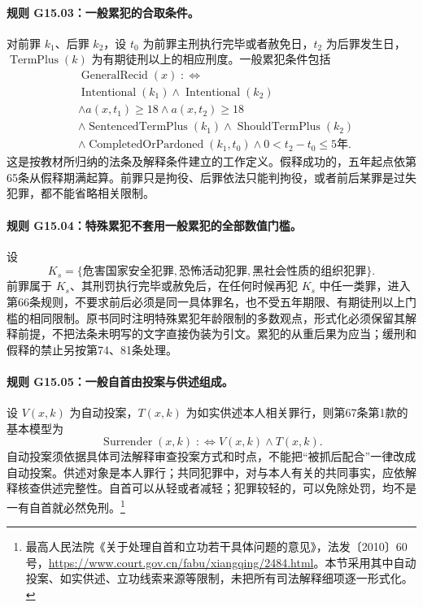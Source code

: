 \paragraph{规则 G15.03：一般累犯的合取条件。}
对前罪 $k_1$、后罪 $k_2$，设 $t_0$ 为前罪主刑执行完毕或者赦免日，$t_2$ 为后罪发生日，$\operatorname{TermPlus}(k)$ 为有期徒刑以上的相应刑度。一般累犯条件包括
\[
\begin{aligned}
&\operatorname{GeneralRecid}(x)\;:\!\!\iff\\
&\operatorname{Intentional}(k_1)\land\operatorname{Intentional}(k_2)\\
&\land a(x,t_1)\ge18\land a(x,t_2)\ge18\\
&\land\operatorname{SentencedTermPlus}(k_1)
\land\operatorname{ShouldTermPlus}(k_2)\\
&\land\operatorname{CompletedOrPardoned}(k_1,t_0)
\land 0<t_2-t_0\le5\text{年}.
\end{aligned}
\]
这是按教材所归纳的法条及解释条件建立的工作定义。假释成功的，五年起点依第65条从假释期满起算。前罪只是拘役、后罪依法只能判拘役，或者前后某罪是过失犯罪，都不能省略相关限制。

\paragraph{规则 G15.04：特殊累犯不套用一般累犯的全部数值门槛。}
设
\[
K_s=\{\text{危害国家安全犯罪},\text{恐怖活动犯罪},
\text{黑社会性质的组织犯罪}\}.
\]
前罪属于 $K_s$、其刑罚执行完毕或赦免后，在任何时候再犯 $K_s$ 中任一类罪，进入第66条规则，不要求前后必须是同一具体罪名，也不受五年期限、有期徒刑以上门槛的相同限制。原书同时注明特殊累犯年龄限制的多数观点，形式化必须保留其解释前提，不把法条未明写的文字直接伪装为引文。累犯的从重后果为应当；缓刑和假释的禁止另按第74、81条处理。

\paragraph{规则 G15.05：一般自首由投案与供述组成。}
设 $V(x,k)$ 为自动投案，$T(x,k)$ 为如实供述本人相关罪行，则第67条第1款的基本模型为
\[
\operatorname{Surrender}(x,k)\;:\!\!\iff V(x,k)\land T(x,k).
\]
自动投案须依据具体司法解释审查投案方式和时点，不能把“被抓后配合”一律改成自动投案。供述对象是本人罪行；共同犯罪中，对与本人有关的共同事实，应依解释核查供述完整性。自首可以从轻或者减轻；犯罪较轻的，可以免除处罚，均不是一有自首就必然免刑。\footnote{最高人民法院《关于处理自首和立功若干具体问题的意见》，法发〔2010〕60号，\url{https://www.court.gov.cn/fabu/xiangqing/2484.html}。本节采用其中自动投案、如实供述、立功线索来源等限制，未把所有司法解释细项逐一形式化。}

